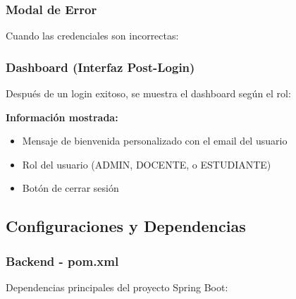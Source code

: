 \documentclass[11pt,a4paper]{article}
\begin{document}
\subsubsection{Modal de Error}

Cuando las credenciales son incorrectas:


\subsubsection{Dashboard (Interfaz Post-Login)}

Después de un login exitoso, se muestra el dashboard según el rol:


\textbf{Información mostrada:}
\begin{itemize}
    \item Mensaje de bienvenida personalizado con el email del usuario
    \item Rol del usuario (ADMIN, DOCENTE, o ESTUDIANTE)
    \item Botón de cerrar sesión
\end{itemize}

\subsection{Configuraciones y Dependencias}

\subsubsection{Backend - pom.xml}

Dependencias principales del proyecto Spring Boot:
\end{document}
